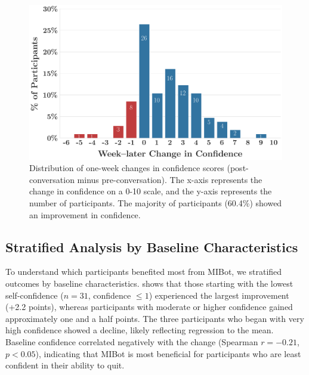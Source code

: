 \begin{figure}[ht]
	\centering
	\includegraphics[width=0.8\linewidth]{fig/2024-11-14-MIV6.3A-2024-11-22-MIV6.3A_ruler_deltas_delta_with_week_later_keep_high_conf_False_change.png}
	\caption[Distribution of Confidence Changes]{Distribution of one-week changes in confidence scores (post-conversation minus pre-conversation). The x-axis represents the change in confidence on a 0-10 scale, and the y-axis represents the number of participants. The majority of participants (60.4\%) showed an improvement in confidence.}
	\label{fig:confidence_change_distribution}
\end{figure}



\subsection*{Stratified Analysis by Baseline Characteristics}

To understand which participants benefited most from MIBot, we stratified outcomes by baseline characteristics.  shows that those starting with the lowest self-confidence ($n=31$, confidence $\leq 1$) experienced the largest improvement (+2.2 points), whereas participants with moderate or higher confidence gained approximately one and a half points. The three participants who began with very high confidence showed a decline, likely reflecting regression to the mean. Baseline confidence correlated negatively with the change (Spearman $r=-0.21$, $p<0.05$), indicating that MIBot is most beneficial for participants who are least confident in their ability to quit.

